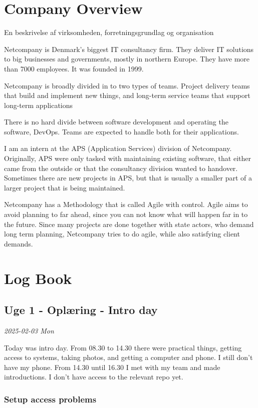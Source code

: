 \documentclass[../main.tex]{subfiles}
\begin{document}
\section{Company Overview}
En beskrivelse af virksomheden, forretningsgrundlag og organisation 

Netcompany is Denmark's biggest IT consultancy firm.
They deliver IT solutions to big businesses and governments, mostly in northern Europe.
They have more than 7000 employees. It was founded in 1999. 

Netcompany is broadly divided in to two types of teams.
Project delivery teams that build and implement new things, and long-term service teams that support long-term applications

There is no hard divide between software development and operating the software, DevOps. Teams are expected to handle both for their applications. 

I am an intern at the APS (Application Services) division of Netcompany.
Originally, APS were only tasked with maintaining existing software, that either came from the outside or that the consultancy division wanted to handover.
Sometimes there are new projects in APS, but that is usually a smaller part of a larger project that is being maintained.  

Netcompany has a Methodology that is called Agile with control. Agile aims to avoid planning to far ahead, since you can not know what will happen far in to the future.
Since many projects are done together with state actors, who demand long term planning, Netcompany tries to do agile, while also satisfying client demands. 
\section{Log Book}
\subsection{Uge 1 - Oplæring - \textbf{Intro day}}

\textit{2025-02-03 Mon}

Today was intro day. From 08.30 to 14.30 there were practical things, getting access to systems, taking photos, and getting a computer and phone. I still don't have my phone. From 14.30 until 16.30 I met with my team and made introductions. I don't have access to the relevant repo yet.

\subsubsection{\textbf{Setup access problems}}
\end{document}
